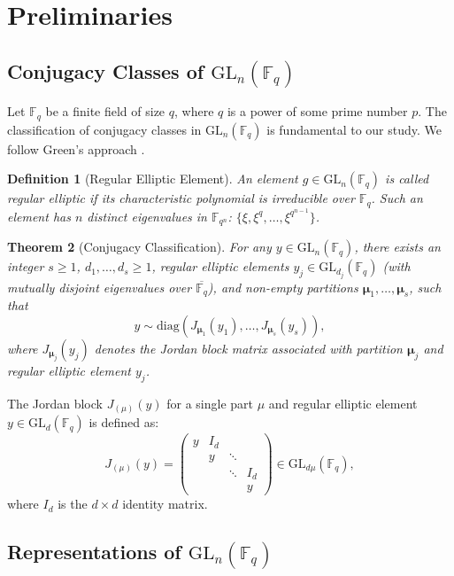 \documentclass[11pt]{article}
\newtheorem{theorem}{Theorem}[section]
\newtheorem{definition}[theorem]{Definition}
\newcommand{\Fq}{\mathbb{F}_q}
\newcommand{\GL}{\mathrm{GL}}
\newcommand{\diag}{\mathrm{diag}}
\begin{document}
\section{Preliminaries}
\label{sec:preliminaries}

\subsection{Conjugacy Classes of $\GL_n(\Fq)$}

Let $\Fq$ be a finite field of size $q$, where $q$ is a power of some prime number $p$. The classification of conjugacy classes in $\GL_n(\Fq)$ is fundamental to our study. We follow Green's approach \cite{green1955characters}.
\medskip

\begin{definition}[Regular Elliptic Element]
An element $g \in \GL_n(\Fq)$ is called \emph{regular elliptic} if its characteristic polynomial is irreducible over $\Fq$. Such an element has $n$ distinct eigenvalues in $\mathbb{F}_{q^n}$: $\{\xi, \xi^q, \ldots, \xi^{q^{n-1}}\}$.
\end{definition}
\medskip

\begin{theorem}[Conjugacy Classification] \cite{green1955characters}
For any $y \in \GL_n(\Fq)$, there exists an integer $s \geq 1$, $d_1, \ldots, d_s \geq 1$, regular elliptic elements $y_j \in \GL_{d_j}(\Fq)$ (with mutually disjoint eigenvalues over $\overline{\Fq}$), and non-empty partitions $\bm{\mu}_1, \ldots, \bm{\mu}_s$, such that
\[
y \sim \diag\left(J_{\bm{\mu}_1}(y_1), \ldots, J_{\bm{\mu}_s}(y_s)\right),
\]
where $J_{\bm{\mu}_j}(y_j)$ denotes the Jordan block matrix associated with partition $\bm{\mu}_j$ and regular elliptic element $y_j$.
\end{theorem}
\medskip

The Jordan block $J_{(\mu)}(y)$ for a single part $\mu$ and regular elliptic element $y \in \GL_d(\Fq)$ is defined as:
\[
J_{(\mu)}(y) = \begin{pmatrix}
	y & I_d & & \\
	& y & \ddots & \\
	& & \ddots & I_d \\
	& & & y
\end{pmatrix} \in \GL_{d\mu}(\Fq),
\]
where $I_d$ is the $d \times d$ identity matrix.

\subsection{Representations of $\GL_n(\Fq)$}
\end{document}
